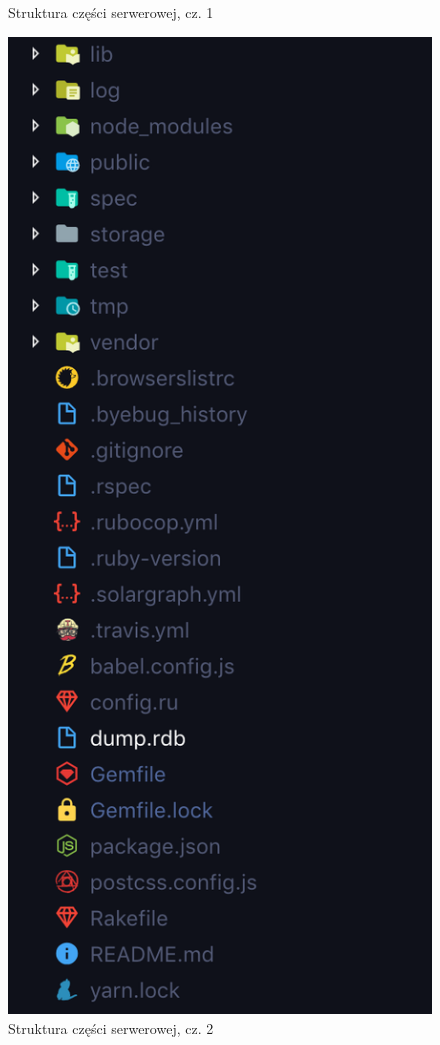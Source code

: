 \documentclass[declaration,shortabstract,polish,inz]{iithesis}
\begin{document}
\begin{figure}[H]
\begin{minipage}[b]{0.4\textwidth}
        \caption{Struktura części serwerowej, cz. 1}
        \label{fig:struktura_serwer1}
    \end{minipage}
    \hfill
    \begin{minipage}[b]{0.4\textwidth}
        \includegraphics[width=\textwidth]{images/serwer2.png}
        \caption{Struktura części serwerowej, cz. 2}
        \label{fig:struktura_serwer2}
    \end{minipage}
\end{figure}
\end{document}
